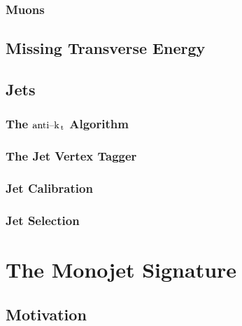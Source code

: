\documentclass[10pt,twoside,cucitura,classica,english,openany]{toptesi}
\begin{document}
\subsection{Muons}
\label{sec:muons}



\section{Missing Transverse Energy}
\label{sec:miss-transv-energy}



\section{Jets}
\label{sec:jets}



\subsection{The \emph{$\text{anti--k}_\mathrm{\, t}$} Algorithm}
\label{sec:anti-k_t}



\subsection{The Jet Vertex Tagger }
\label{sec:jet-vertex-tagger}



\subsection{Jet Calibration}
\label{sec:jet-calibration}



\subsection{Jet Selection}
\label{sec:jet-selection}



\chapter{The Monojet Signature}
\label{cha:monojet-signature}

\section{Motivation}
\label{sec:motivation}
\end{document}
